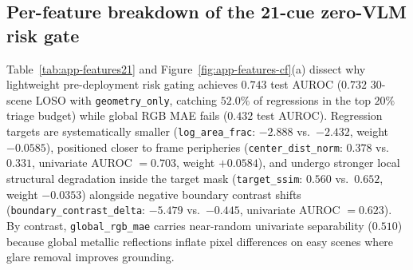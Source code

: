 \subsection{Per-feature breakdown of the 21-cue zero-VLM risk gate}
Table~\ref{tab:app-features21} and Figure~\ref{fig:app-features-cf}(a) dissect why lightweight pre-deployment risk gating achieves $0.743$ test \textsc{AUROC} ($0.732$ 30-scene \textsc{LOSO} with \texttt{geometry\_only}, catching $52.0\%$ of regressions in the top $20\%$ triage budget) while global \textsc{RGB MAE} fails ($0.432$ test \textsc{AUROC}). Regression targets are systematically smaller (\texttt{log\_area\_frac}: $-2.888$ vs.\ $-2.432$, weight $-0.0585$), positioned closer to frame peripheries (\texttt{center\_dist\_norm}: $0.378$ vs.\ $0.331$, univariate \textsc{AUROC} $= 0.703$, weight $+0.0584$), and undergo stronger local structural degradation inside the target mask (\texttt{target\_ssim}: $0.560$ vs.\ $0.652$, weight $-0.0353$) alongside negative boundary contrast shifts (\texttt{boundary\_contrast\_delta}: $-5.479$ vs.\ $-0.445$, univariate \textsc{AUROC} $= 0.623$). By contrast, \texttt{global\_rgb\_mae} carries near-random univariate separability ($0.510$) because global metallic reflections inflate pixel differences on easy scenes where glare removal improves grounding.
